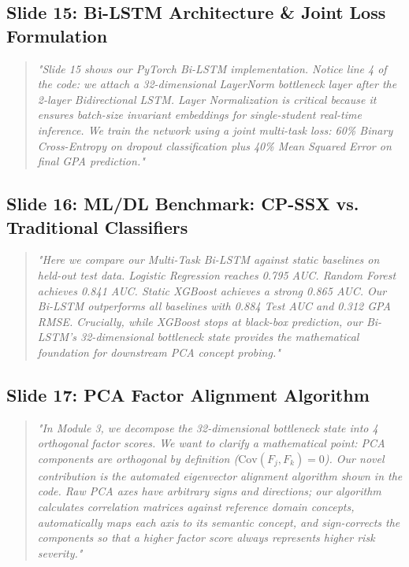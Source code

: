 \documentclass[11pt, a4paper]{article}
\begin{document}
\subsection{Slide 15: Bi-LSTM Architecture \& Joint Loss Formulation}
\begin{quote}\small \itshape
"Slide 15 shows our PyTorch Bi-LSTM implementation. Notice line 4 of the code: we attach a 32-dimensional LayerNorm bottleneck layer after the 2-layer Bidirectional LSTM. Layer Normalization is critical because it ensures batch-size invariant embeddings for single-student real-time inference. We train the network using a joint multi-task loss: 60\% Binary Cross-Entropy on dropout classification plus 40\% Mean Squared Error on final GPA prediction."
\end{quote}

\subsection{Slide 16: ML/DL Benchmark: CP-SSX vs. Traditional Classifiers}
\begin{quote}\small \itshape
"Here we compare our Multi-Task Bi-LSTM against static baselines on held-out test data. Logistic Regression reaches 0.795 AUC. Random Forest achieves 0.841 AUC. Static XGBoost achieves a strong 0.865 AUC. Our Bi-LSTM outperforms all baselines with 0.884 Test AUC and 0.312 GPA RMSE. Crucially, while XGBoost stops at black-box prediction, our Bi-LSTM's 32-dimensional bottleneck state provides the mathematical foundation for downstream PCA concept probing."
\end{quote}

\subsection{Slide 17: PCA Factor Alignment Algorithm}
\begin{quote}\small \itshape
"In Module 3, we decompose the 32-dimensional bottleneck state into 4 orthogonal factor scores. We want to clarify a mathematical point: PCA components are orthogonal by definition ($\text{Cov}(F_j, F_k) = 0$). Our novel contribution is the automated eigenvector alignment algorithm shown in the code. Raw PCA axes have arbitrary signs and directions; our algorithm calculates correlation matrices against reference domain concepts, automatically maps each axis to its semantic concept, and sign-corrects the components so that a higher factor score always represents higher risk severity."
\end{quote}
\end{document}
